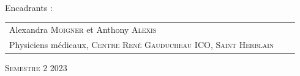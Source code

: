 \begin{titlepage}
\begin{center}
    \vspace{1.5cm}
    
    \end{center}
    
    Encadrants :
    
    \small {
    \begin{tabular}{llr}\\
    Alexandra \textsc{Moigner} et Anthony \textsc{Alexis}   &  &  \\
      Physiciens médicaux, \textsc{Centre René Gauducheau ICO, Saint Herblain} &    &  \\
    
    \end{tabular}
    }

    \vspace{1.5cm}


    \begin{center}
    \textsc{Semestre 2 2023}
    \end{center}
    
\end{titlepage}
\let\cleardoublepage\clearpage
